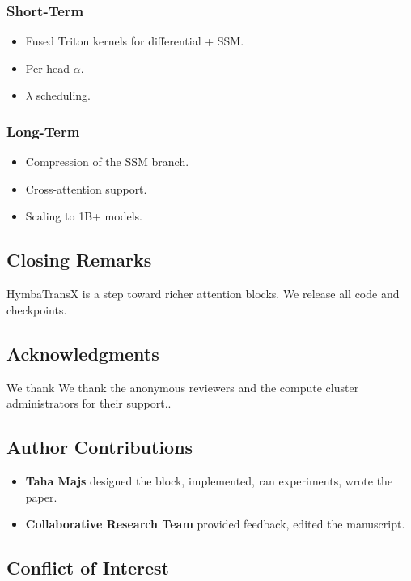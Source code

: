 \subsubsection{Short-Term}
\begin{itemize}
\item Fused Triton kernels for differential + SSM.
\item Per-head $\alpha$.
\item $\lambda$ scheduling.

\end{itemize}
\subsubsection{Long-Term}
\begin{itemize}
\item Compression of the SSM branch.
\item Cross-attention support.
\item Scaling to 1B+ models.

\end{itemize}
\subsection{Closing Remarks}

HymbaTransX is a step toward richer attention blocks. We release all code 
and checkpoints.

\subsection{Acknowledgments}

We thank We thank the anonymous reviewers and the compute cluster administrators for their support..

\subsection{Author Contributions}

\begin{itemize}
\item \textbf{Taha Majs} designed the block, implemented, ran experiments, wrote
  the paper.
\item \textbf{Collaborative Research Team} provided feedback, edited the manuscript.

\end{itemize}
\subsection{Conflict of Interest}


